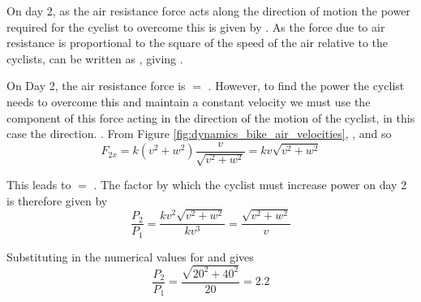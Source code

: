 \begin{problem}
{\begin{enumerate}
On day 2, as the air resistance force acts along the direction of motion the power required for the cyclist to overcome this is given by . As the force due to air resistance is proportional to the square of the speed of the air relative to the cyclists,  can be written as , giving .

On Day 2, the air resistance force is  $=$ . However, to find the power the cyclist needs to overcome this and maintain a constant velocity we must use the component of this force acting in the direction of the motion of the cyclist, in this case the   direction. . From Figure  \ref{fig:dynamics_bike_air_velocities}, , and so 
\begin{equation} 
F_{2x} = k (v^2 + w^2) \frac{v}{\sqrt{v^2 + w^2}} = kv \sqrt{v^2 + w^2}  
\end{equation}

This leads to  $=$ . The factor by which the cyclist must increase power on day 2 is therefore given by
\begin{equation} 
\frac{P_2}{P_1} = \frac{ kv^2 \sqrt{v^2 + w^2}}{k v^3} = \frac{ \sqrt{v^2 + w^2}}{v}
\end{equation}

Substituting in the numerical values for  and  gives  
\begin{equation}
\frac{P_2}{P_1}= \frac{ \sqrt{20^2 + 40^2}}{20} = 2.2
\end{equation}

\end{enumerate}
}
\end{problem}
%


